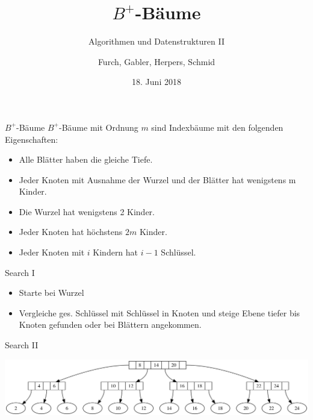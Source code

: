 \documentclass[]{beamer}
\begin{document}
\title{$B^{+}$-Bäume}
\subtitle{Algorithmen und Datenstrukturen II}
\author{Furch, Gabler, Herpers, Schmid}
\date{18. Juni 2018}

\begin{frame}[plain]
\titlepage
\end{frame}

\begin{frame}{$B^{+}$-Bäume}
$B^{+}$-Bäume mit Ordnung $m$ sind Indexbäume mit den folgenden Eigenschaften:
\begin{itemize}
	\item Alle Blätter haben die gleiche Tiefe.
	\item Jeder Knoten mit Ausnahme der Wurzel und der Blätter hat wenigstens m Kinder.
	\item Die Wurzel hat wenigstens 2 Kinder.
	\item Jeder Knoten hat höchstens $2m$ Kinder.
	\item Jeder Knoten mit $i$ Kindern hat $i-1$ Schlüssel.
\end{itemize}
\end{frame}

\begin{frame}{Search I}
\begin{itemize}
	\item Starte bei Wurzel
	\item Vergleiche ges. Schlüssel mit Schlüssel in Knoten und steige Ebene tiefer bis Knoten gefunden oder bei Blättern angekommen.
\end{itemize}
\end{frame}

\begin{frame}{Search II}
\begin{center}
	\includegraphics[scale=0.3]{example_11.png} \hspace{0.3cm}
\end{center}
\end{frame}
\end{document}
